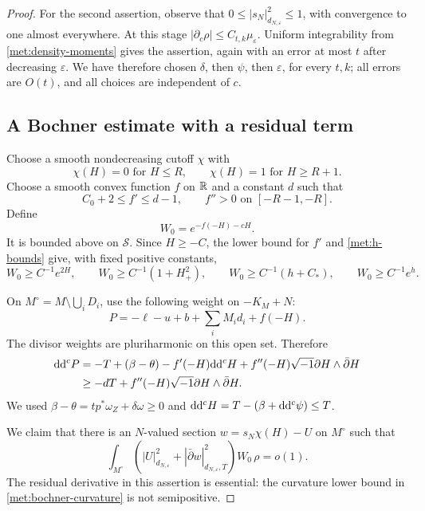 \begin{proof}
For the second assertion, observe that
\(0\leq|s_N|_{d_{N,\varepsilon}}^2\leq1\), with convergence to one
almost everywhere.  At this stage
\(|\partial_c\rho|\leq C_{t,k}\mu_\varepsilon\).
Uniform integrability from \eqref{met:density-moments} gives the
assertion, again with an error at most \(t\) after decreasing
\(\varepsilon\).  We have therefore chosen \(\delta\), then
\(\psi\), then \(\varepsilon\), for every \(t,k\); all errors are
\(O(t)\), and all choices are independent of \(c\).

\subsection*{A Bochner estimate with a residual term}

Choose a smooth nondecreasing cutoff \(\chi\) with
\[
 \chi(H)=0\text{ for }H\leq R,
 \qquad \chi(H)=1\text{ for }H\geq R+1.
\]
Choose a smooth convex function \(f\) on \(\mathbb{R}\) and a constant \(d\)
such that
\[
 C_0+2\leq f'\leq d-1,
 \qquad f''>0\text{ on }[-R-1,-R].
\]
Define
\begin{equation}
 \label{met:transport-weight}
 W_0=e^{-f(-H)-cH}.
\end{equation}
It is bounded above on \(\mathcal S\).  Since \(H\geq-C\), the lower
bound for \(f'\) and \eqref{met:h-bounds} give, with fixed positive
constants,
\begin{equation}
 \label{met:weight-domination}
 W_0\geq C^{-1}e^{2H},
 \qquad
 W_0\geq C^{-1}(1+H_+^2),
 \qquad
 W_0\geq C^{-1}(h+C_*),
 \qquad
 W_0\geq C^{-1}e^h.
\end{equation}

On \(M^\circ=M\setminus\bigcup_iD_i\), use the following weight on
\(-K_M+N\):
\begin{equation}
 \label{met:bochner-weight}
 P=-\ell-u+b+\sum_iM_i d_i+f(-H).
\end{equation}
The divisor weights are pluriharmonic on this open set.  Therefore
\begin{align}
 \label{met:bochner-curvature}
 \mathrm{d}\mathrm{d}^{c} P
 &=-T+(\beta-\theta)-f'(-H)\mathrm{d}\mathrm{d}^{c} H
       +f''(-H)\sqrt{-1}\partial H\wedge\bar\partial H\notag\\
 &\geq-dT+f''(-H)\sqrt{-1}\partial H\wedge\bar\partial H.
\end{align}
We used \(\beta-\theta=t p^*\omega_Z+\delta\omega\geq0\) and
\(\mathrm{d}\mathrm{d}^{c} H=T-(\beta+\mathrm{d}\mathrm{d}^{c}\psi)\leq T\).

We claim that there is an \(N\)-valued section
\(w=s_N\chi(H)-U\) on \(M^\circ\) such that
\begin{equation}
 \label{met:bochner-result}
 \int_{M^\circ}
 \left(|U|_{d_{N,\varepsilon}}^2
       +|\bar\partial w|_{d_{N,\varepsilon},T}^2\right)
 W_0\,\rho=o(1).
\end{equation}
The residual derivative in this assertion is essential: the curvature
lower bound in \eqref{met:bochner-curvature} is not semipositive.


\end{proof}
